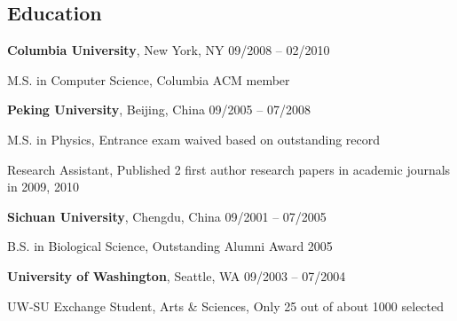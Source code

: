 \documentclass[margin,line]{resume}
\begin{document}
\begin{resume}
    \section{\mysidestyle Education}

    \textbf{Columbia University}, New York, NY \hfill 09/2008 -- 02/2010 \vspace{-3mm}\\\vspace{-1mm}%
      \begin{list2}
       \item M.S. in Computer Science, Columbia ACM member
      \end{list2}
 

    \textbf{Peking University}, Beijing, China \hfill 09/2005 -- 07/2008 \vspace{-3mm}\\\vspace{-1mm}%
      \begin{list2}
       \item M.S. in Physics, Entrance exam waived based on outstanding record
       \item Research Assistant, Published 2 first author research papers in academic journals in 2009, 2010
      \end{list2}
    
    \textbf{Sichuan University}, Chengdu, China \hfill 09/2001 -- 07/2005 \vspace{-3mm}\\\vspace{-1mm}%
      \begin{list2}
       \item B.S. in Biological Science, Outstanding Alumni Award 2005
      \end{list2}

    \textbf{University of Washington}, Seattle, WA \hfill 09/2003 -- 07/2004 \vspace{-3mm}\\\vspace{-1mm}%
      \begin{list2}
       \item  UW-SU Exchange Student, Arts \& Sciences, Only 25 out of about 1000 selected
      \end{list2}



\end{resume}
\end{document}
